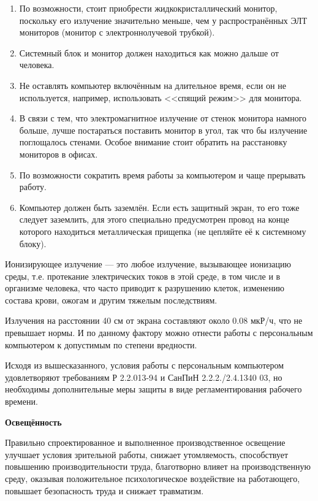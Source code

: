 \begin{enumerate}[1.]
	\item По возможности, стоит приобрести жидкокристаллический монитор, поскольку его излучение значительно меньше, чем у распространённых ЭЛТ мониторов (монитор с электроннолучевой трубкой). 
	\item Системный блок и монитор должен находиться как можно дальше от человека.
	\item Не оставлять компьютер включённым на длительное время, если он не используется, например, использовать <<спящий режим>> для монитора.
	\item В связи с тем, что электромагнитное излучение от стенок монитора намного больше, лучше постараться поставить монитор в угол, так что бы излучение поглощалось стенами. Особое внимание стоит обратить на расстановку мониторов в офисах.
	\item По возможности сократить время работы за компьютером и чаще прерывать работу.
	\item Компьютер должен быть заземлён. Если есть защитный экран, то его тоже следует заземлить, для этого специально предусмотрен провод на конце которого находиться металлическая прищепка (не цепляйте её к системному блоку).
\end{enumerate}

Ионизирующее излучение --- это любое излучение, вызывающее ионизацию среды, т.е. протекание электрических токов в этой среде, в том числе и в организме человека, что часто приводит к разрушению клеток, изменению состава крови, ожогам и другим тяжелым последствиям.

Излучения на расстоянии 40 см от экрана составляют около 0.08 мкР/ч, что не превышает нормы.
И по данному фактору можно отнести работы с персональным компьютером к допустимым по степени вредности. 

Исходя из вышесказанного, условия работы с персональным компьютером удовлетворяют требованиям Р 2.2.013-94 и СанПиН 2.2.2./2.4.1340 03, но необходимы дополнительные меры защиты в виде регламентирования рабочего времени.

\textbf{\point Освещённость}

Правильно спроектированное и выполненное производственное освещение улучшает условия зрительной работы, снижает утомляемость, способствует повышению производительности труда, благотворно влияет на производственную среду, оказывая положительное психологическое воздействие на работающего, повышает безопасность труда и  снижает травматизм.

